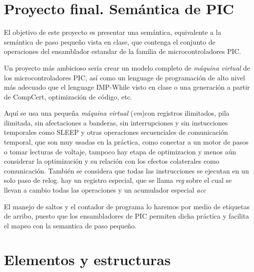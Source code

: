 \documentclass[12pt]{report}
\begin{document}

\begin{coqdoccode}
\end{coqdoccode}
\section{Proyecto final. Semántica de PIC}

\begin{coqdoccode}
\coqdocemptyline
\coqdocemptyline
\end{coqdoccode}
El objetivo de este proyecto es presentar una semántica, equivalente a la semántica de paso pequeño vista en clase, que contenga el conjunto de operaciones del ensamblador estandar de la familia de microcontroladores PIC. 


Un proyecto más ambicioso sería crear un modelo completo de \textit{máquina virtual} de los microcontroladores PIC, así como un lenguage de programación de alto nivel más adecuado que el lenguage IMP-While visto en clase o una generación a partir de CompCert, optimización de código, etc.


Aquí se usa una pequeña \textit{máquina virtual} (\textit{vm})con registros ilimitados, pila ilimitada, sin afectaciones a banderas, sin interrupciones y sin instucciones temporales como SLEEP y otras operaciones secuenciales de comunicación temporal, que son muy usadas en la práctica, como conectar a un motor de pasos o tomar lecturas de voltaje, tampoco hay etapa de optimizacion y menos aún considerar la optimización y su relación con los efectos colaterales como comunicación. También se considera que todas las instrucciones se ejecutan en un solo paso de relog. hay un registro especial, que se llama \textit{reg} sobre el cual se llevan a cambio todas las operaciones y un acumulador especial \textit{acc}

El manejo de saltos y el contador de programa lo haremos por medio de etiquetas de arribo, puesto que los ensambladores de PIC permiten dicha práctica y facilita el mapeo con la semantica de paso pequeño. 

\section{Elementos y estructuras}
\end{document}
